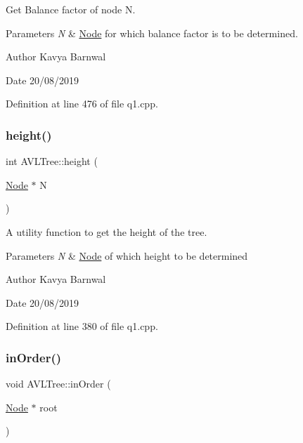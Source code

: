 Get Balance factor of node N. 
\begin{DoxyParams}{Parameters}
{\em N} & \hyperlink{class_node}{Node} for which balance factor is to be determined. \\
\hline
\end{DoxyParams}
\begin{DoxyAuthor}{Author}
Kavya Barnwal 
\end{DoxyAuthor}
\begin{DoxyDate}{Date}
20/08/2019 
\end{DoxyDate}


Definition at line 476 of file q1.\+cpp.

\mbox{\label{class_a_v_l_tree_a96cbfc11d7b61204423d22d4dec3cb39}} 
\subsubsection{\texorpdfstring{height()}{height()}}
{\footnotesize\ttfamily int A\+V\+L\+Tree\+::height (\begin{DoxyParamCaption}\item[{\hyperlink{class_node}{Node} $\ast$}]{N }\end{DoxyParamCaption})\hspace{0.3cm}{\ttfamily [inline]}}

A utility function to get the height of the tree. 
\begin{DoxyParams}{Parameters}
{\em N} & \hyperlink{class_node}{Node} of which height to be determined \\
\hline
\end{DoxyParams}
\begin{DoxyAuthor}{Author}
Kavya Barnwal 
\end{DoxyAuthor}
\begin{DoxyDate}{Date}
20/08/2019 
\end{DoxyDate}


Definition at line 380 of file q1.\+cpp.

\mbox{\label{class_a_v_l_tree_a3dc3f18fce5d4124bfb94eb6cfa2e400}} 
\subsubsection{\texorpdfstring{in\+Order()}{inOrder()}}
{\footnotesize\ttfamily void A\+V\+L\+Tree\+::in\+Order (\begin{DoxyParamCaption}\item[{\hyperlink{class_node}{Node} $\ast$}]{root }\end{DoxyParamCaption})\hspace{0.3cm}{\ttfamily [inline]}}

